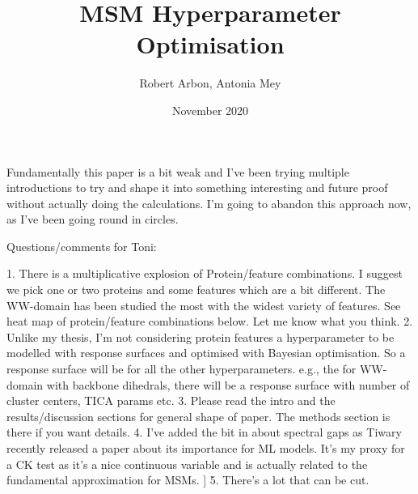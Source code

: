 \documentclass{article}
\title{MSM Hyperparameter Optimisation}
\author{Robert Arbon, Antonia Mey}
\date{November 2020}
\begin{document}
\maketitle




Fundamentally this paper is a bit weak and I've been trying multiple introductions to try and shape it into something interesting and future proof without actually doing the calculations. I'm going to abandon this approach now, as I've been going round in circles. 

Questions/comments for Toni: 

1. There is a multiplicative explosion of Protein/feature combinations. I suggest we pick one or two proteins and some features which are a bit different.  The WW-domain has been studied the most with the widest variety of features. See heat map of protein/feature combinations  below. Let me know what you think. 
2. Unlike my thesis, I'm not considering protein features a hyperparameter to be modelled with response surfaces and optimised with Bayesian optimisation.  So a response surface will be for all the other hyperparameters.  e.g., the for WW-domain with backbone dihedrals, there will be a response surface with number of cluster centers, TICA params etc. 
3. Please read the intro and the results/discussion sections for general shape of paper.  The methods section is there if you want details.  
4. I've added the bit in about spectral gaps as Tiwary recently released a paper about its importance for ML models.  It's my proxy for a CK test as it's a nice continuous variable and is actually related to the fundamental approximation for MSMs. ]
5. There's a lot that can be cut. 
\end{document}
